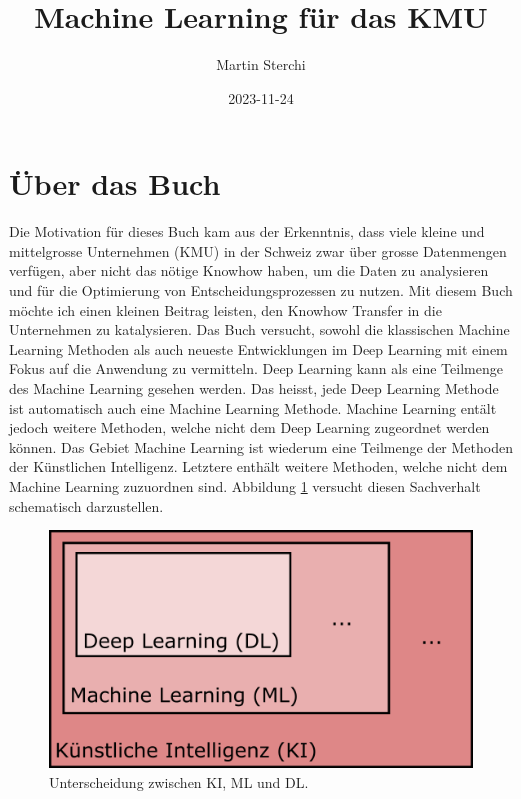 \documentclass[
]{book}
\title{Machine Learning für das KMU}
\author{Martin Sterchi}
\date{2023-11-24}
\begin{document}
\maketitle

{
\setcounter{tocdepth}{1}
\tableofcontents
}
\hypertarget{uxfcber-das-buch}{%
\chapter*{Über das Buch}\label{uxfcber-das-buch}}

Die Motivation für dieses Buch kam aus der Erkenntnis, dass viele kleine und mittelgrosse Unternehmen (KMU) in der Schweiz zwar über grosse Datenmengen verfügen, aber nicht das nötige Knowhow haben, um die Daten zu analysieren und für die Optimierung von Entscheidungsprozessen zu nutzen. Mit diesem Buch möchte ich einen kleinen Beitrag leisten, den Knowhow Transfer in die Unternehmen zu katalysieren. Das Buch versucht, sowohl die klassischen Machine Learning Methoden als auch neueste Entwicklungen im Deep Learning mit einem Fokus auf die Anwendung zu vermitteln. Deep Learning kann als eine Teilmenge des Machine Learning gesehen werden. Das heisst, jede Deep Learning Methode ist automatisch auch eine Machine Learning Methode. Machine Learning entält jedoch weitere Methoden, welche nicht dem Deep Learning zugeordnet werden können. Das Gebiet Machine Learning ist wiederum eine Teilmenge der Methoden der Künstlichen Intelligenz. Letztere enthält weitere Methoden, welche nicht dem Machine Learning zuzuordnen sind. Abbildung \ref{fig:kimldl} versucht diesen Sachverhalt schematisch darzustellen.

\begin{figure}

{\centering \includegraphics[width=0.6\linewidth]{images/KI_ML_DL} 

}

\caption{Unterscheidung zwischen KI, ML und DL. }\label{fig:kimldl}
\end{figure}
\end{document}
